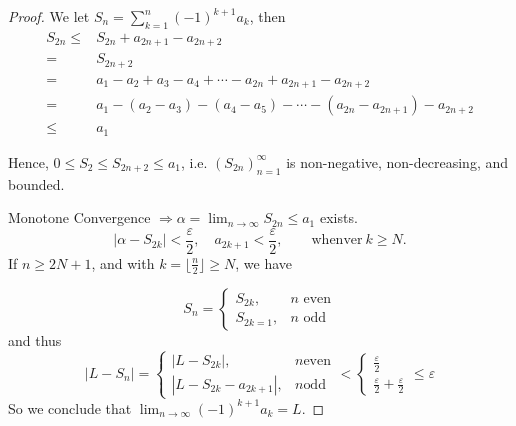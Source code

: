 \documentclass[12pt]{article}
\theoremstyle{plain}
\newcommand{\abs}[1]{\left| #1 \right|}
\newcommand{\floor}[1]{\lfloor #1 \rfloor}
\newcommand{\ep}{\varepsilon}
\begin{document}
\begin{proof}
	We let $S_n = \sum_{k=1}^n (-1)^{k+1}a_k$, then 
	\begin{align*}
		S_{2n} \leq& S_{2n} + a_{2n+1} - a_{2n+2}	\\
		=& S_{2n+2}	\\
		=& a_1 - a_2 + a_3 - a_4 + \cdots - a_{2n} + a_{2n+1} - a_{2n+2}	\\
		=& a_1 - (a_2-a_3) - (a_4-a_5) -\cdots -(a_{2n} -a_{2n+1})-a_{2n+2}	\\
		\leq & a_1
	\end{align*}

	Hence, $0 \leq S_2 \leq S_{2n+2} \leq a_1$, i.e. $(S_{2n})_{n=1}^{\infty}$
	is non-negative, non-decreasing, and bounded. 

	Monotone Convergence $\Rightarrow \alpha = \lim_{n\to\infty} S_{2n}
	\leq a_1$ exists. 
	\[
		\abs {\alpha - S_{2k}} < \frac{\ep}2, \quad a_{2k+1}< \frac{\ep}2,
		\qquad \text{whenver} \ k \geq N. 
	\]
	If $n\geq 2N+1$, and with $k = \floor{\frac n2} \geq N$, we have

	\[
		S_n 
		= 
		\begin{cases}
			S_{2k}, &n  \text{ even}		\\
			S_{2k=1}, &n \text{ odd}
		\end{cases}
	\]
	and thus 
	\[
		\abs{L-S_n} = \begin{cases}
		\abs{L-S_{2k}}, & n \text{even}	\\
		\abs{L-S_{2k} - a_{2k+1}}, & n \text{odd}
		\end{cases}
		< 
		\begin{cases}
			\frac{\ep}2	\\
			\frac{\ep}2 + \frac{\ep}2 
		\end{cases}
		\leq \ep
	\]
	So we conclude that $\lim_{n\to\infty} (-1)^{k+1}a_{k} = L$. 
\end{proof}
\end{document}
